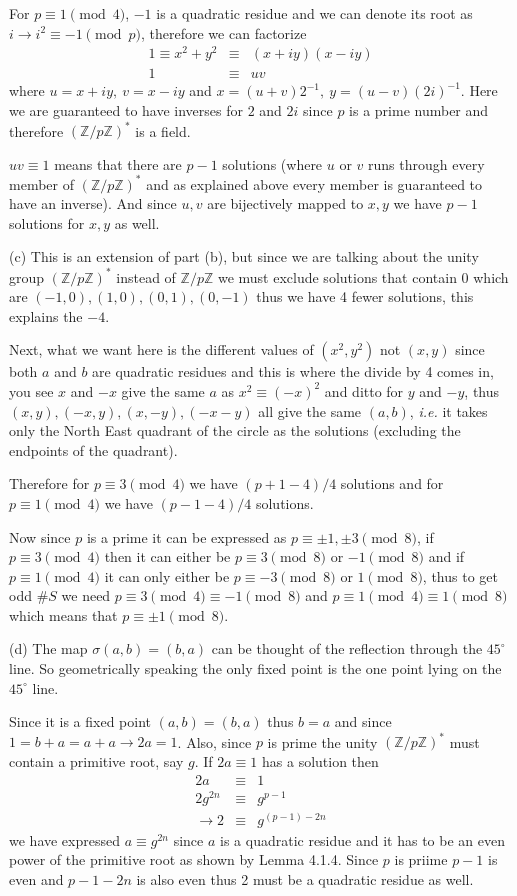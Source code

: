\documentclass[aps,preprint,preprintnumbers,nofootinbib,showpacs,prd]{revtex4-1}
\newcommand{\ie}{{\it i.e.} }
\newcommand{\nbea}{\begin{eqnarray*}}
\newcommand{\neea}{\end{eqnarray*}}
\begin{document}
For $p \equiv 1 \pmod{4}$, $-1$ is a quadratic residue and we can denote its root as $i \to i^2 \equiv -1 \pmod{p}$, therefore we can factorize
%
\nbea
1 \equiv x^2 + y^2 & \equiv & (x + iy)(x - iy) \\
1 & \equiv & uv
\neea
%
where $u = x + iy,~v = x - iy$ and $x = (u+v)2^{-1},~y = (u-v)(2i)^{-1}$. Here we are guaranteed to have inverses for $2$ and $2i$ since $p$ is a prime number and therefore $(\mathbb{Z}/p\mathbb{Z})^*$ is a field.

$uv \equiv 1$ means that there are $p-1$ solutions (where $u$ or $v$ runs through every member of $(\mathbb{Z}/p\mathbb{Z})^*$ and as explained above every member is guaranteed to have an inverse). And since $u,v$ are bijectively mapped to $x,y$ we have $p-1$ solutions for $x,y$ as well.

(c) This is an extension of part (b), but since we are talking about the unity group $(\mathbb{Z}/p\mathbb{Z})^*$ instead of $\mathbb{Z}/p\mathbb{Z}$ we must exclude solutions that contain $0$ which are $(-1,0),(1,0),(0,1),(0,-1)$ thus we have 4 fewer solutions, this explains the $-4$.

Next, what we want here is the different values of $(x^2,y^2)$ not $(x,y)$ since both $a$ and $b$ are quadratic residues and this is where the divide by 4 comes in, you see $x$ and $-x$ give the same $a$ as $x^2 \equiv (-x)^2$ and ditto for $y$ and $-y$, thus $(x,y),(-x,y),(x,-y),(-x-y)$ all give the same $(a,b)$, \ie it takes only the North East quadrant of the circle as the solutions (excluding the endpoints of the quadrant).

Therefore for $p \equiv 3 \pmod{4}$ we have $(p+1-4)/4$ solutions and for $p \equiv 1 \pmod{4}$ we have $(p-1-4)/4$ solutions.

Now since $p$ is a prime it can be expressed as $p \equiv \pm1, \pm3 \pmod{8}$, if $p \equiv 3 \pmod{4}$ then it can either be $p \equiv 3 \pmod{8}$ or $-1 \pmod{8}$ and if $p \equiv 1 \pmod{4}$ it can only either be $p \equiv -3 \pmod{8}$ or $1 \pmod{8}$, thus to get odd $\#S$ we need $p \equiv 3 \pmod{4} \equiv -1 \pmod{8}$ and $p \equiv 1 \pmod{4} \equiv 1 \pmod{8}$ which means that $p \equiv \pm 1 \pmod{8}$.

(d) The map $\sigma(a,b) = (b,a)$ can be thought of the reflection through the $45^\circ$ line. So geometrically speaking the only fixed point is the one point lying on the $45^\circ$ line.

Since it is a fixed point $(a,b) = (b,a)$ thus $b = a$ and since $1 = b + a = a + a \to 2a = 1$. Also, since $p$ is prime the unity $(\mathbb{Z}/p\mathbb{Z})^*$ must contain a primitive root, say $g$. If $2a \equiv 1$ has a solution then
%
\nbea
2a & \equiv & 1 \\
2 g^{2n}& \equiv & g^{p-1} \\
\to 2 & \equiv & g^{(p-1) - 2n}
\neea
%
we have expressed $a \equiv g^{2n}$ since $a$ is a quadratic residue and it has to be an even power of the primitive root as shown by Lemma 4.1.4. Since $p$ is priime $p-1$ is even and $p-1-2n$ is also even thus 2 must be a quadratic residue as well.
\end{document}

